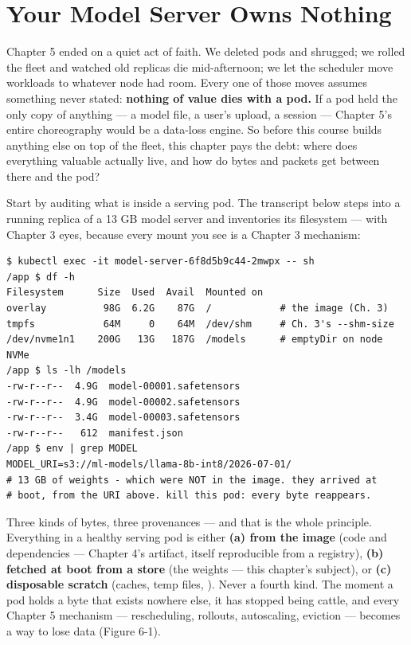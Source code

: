 \section{Your Model Server Owns Nothing}

Chapter 5 ended on a quiet act of faith. We deleted pods and shrugged; we rolled the fleet and watched old replicas die mid-afternoon; we let the scheduler move workloads to whatever node had room. Every one of those moves assumes something never stated: \textbf{nothing of value dies with a pod.} If a pod held the only copy of anything — a model file, a user's upload, a session — Chapter 5's entire choreography would be a data-loss engine. So before this course builds anything else on top of the fleet, this chapter pays the debt: where does everything valuable actually live, and how do bytes and packets get between there and the pod?

Start by auditing what is inside a serving pod. The transcript below steps into a running replica of a 13 GB model server and inventories its filesystem — with Chapter 3 eyes, because every mount you see is a Chapter 3 mechanism:

\begin{terminalbox}
\begin{Verbatim}[breaklines=true,breakanywhere=true,fontsize=\small,formatcom=\color{tbbtermfg},codes=\tbbcodeactive]
$ kubectl exec -it model-server-6f8d5b9c44-2mwpx -- sh
/app $ df -h
Filesystem      Size  Used  Avail  Mounted on
overlay          98G  6.2G    87G  /            # the image (Ch. 3)
tmpfs            64M     0    64M  /dev/shm     # Ch. 3's --shm-size
/dev/nvme1n1    200G   13G   187G  /models      # emptyDir on node NVMe
/app $ ls -lh /models
-rw-r--r--  4.9G  model-00001.safetensors
-rw-r--r--  4.9G  model-00002.safetensors
-rw-r--r--  3.4G  model-00003.safetensors
-rw-r--r--   612  manifest.json
/app $ env | grep MODEL
MODEL_URI=s3://ml-models/llama-8b-int8/2026-07-01/
# 13 GB of weights - which were NOT in the image. they arrived at
# boot, from the URI above. kill this pod: every byte reappears.
\end{Verbatim}
\end{terminalbox}

Three kinds of bytes, three provenances — and that is the whole principle. Everything in a healthy serving pod is either \textbf{(a) from the image} (code and dependencies — Chapter 4's artifact, itself reproducible from a registry), \textbf{(b) fetched at boot from a store} (the weights — this chapter's subject), or \textbf{(c) disposable scratch} (caches, temp files, ). Never a fourth kind. The moment a pod holds a byte that exists nowhere else, it has stopped being cattle, and every Chapter 5 mechanism — rescheduling, rollouts, autoscaling, eviction — becomes a way to lose data (Figure 6-1).

